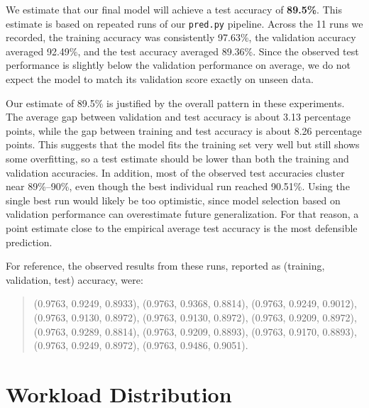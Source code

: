 \documentclass[12pt]{article}
\begin{document}
We estimate that our final model will achieve a test accuracy of \textbf{89.5\%}. This estimate is based on repeated runs of our \texttt{pred.py} pipeline. Across the 11 runs we recorded, the training accuracy was consistently 97.63\%, the validation accuracy averaged 92.49\%, and the test accuracy averaged 89.36\%. Since the observed test performance is slightly below the validation performance on average, we do not expect the model to match its validation score exactly on unseen data.

Our estimate of 89.5\% is justified by the overall pattern in these experiments. The average gap between validation and test accuracy is about 3.13 percentage points, while the gap between training and test accuracy is about 8.26 percentage points. This suggests that the model fits the training set very well but still shows some overfitting, so a test estimate should be lower than both the training and validation accuracies. In addition, most of the observed test accuracies cluster near 89\%--90\%, even though the best individual run reached 90.51\%. Using the single best run would likely be too optimistic, since model selection based on validation performance can overestimate future generalization. For that reason, a point estimate close to the empirical average test accuracy is the most defensible prediction.

For reference, the observed results from these runs, reported as (training, validation, test) accuracy, were:
\begin{quote}
\small
(0.9763, 0.9249, 0.8933), (0.9763, 0.9368, 0.8814), (0.9763, 0.9249, 0.9012),\\
(0.9763, 0.9130, 0.8972), (0.9763, 0.9130, 0.8972), (0.9763, 0.9209, 0.8972),\\
(0.9763, 0.9289, 0.8814), (0.9763, 0.9209, 0.8893), (0.9763, 0.9170, 0.8893),\\
(0.9763, 0.9249, 0.8972), (0.9763, 0.9486, 0.9051).
\normalsize
\end{quote}


\section{Workload Distribution}

\end{document}
